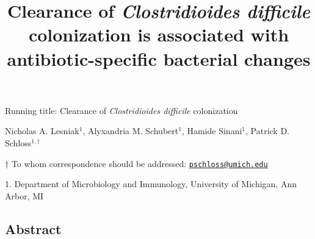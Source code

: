\documentclass[11pt,]{article}
\title{\textbf{Clearance of \emph{Clostridioides difficile}
colonization is associated with antibiotic-specific bacterial changes}}
\author{}
\date{}
\begin{document}
\maketitle

\vspace{30mm}

Running title: Clearance of \emph{Clostridioides difficile} colonization

\vspace{20mm}

Nicholas A. Lesniak\(^1\), Alyxandria M. Schubert\(^1\), Hamide
Sinani\(^1\), Patrick D. Schloss\(^{1,\dagger}\)

\vspace{30mm}

\(\dagger\) To whom correspondence should be addressed:
\href{mailto:pschloss@umich.edu}{\nolinkurl{pschloss@umich.edu}}

1. Department of Microbiology and Immunology, University of Michigan,
Ann Arbor, MI

\newpage
\linenumbers

\hypertarget{abstract}{%
\subsection{Abstract}\label{abstract}}
\end{document}
